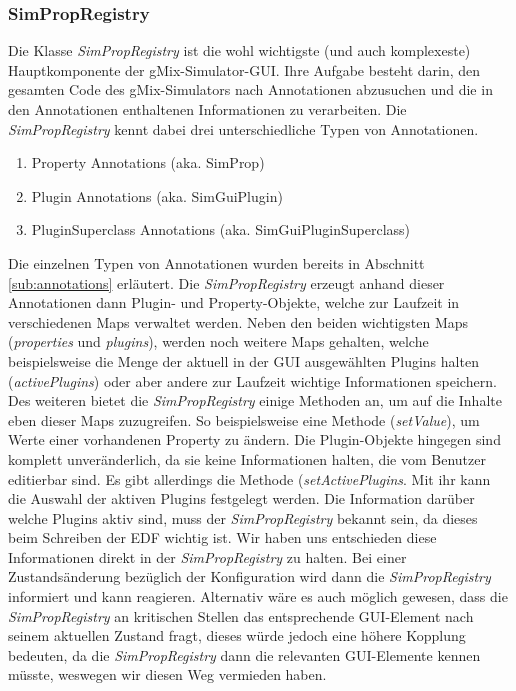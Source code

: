 \documentclass[a4paper, 11pt]{article} %
\begin{document}
\subsubsection{SimPropRegistry}
\label{sssub:simpropregistry}
Die Klasse \emph{SimPropRegistry} ist die wohl wichtigste (und auch komplexeste) Hauptkomponente der gMix-Simulator-GUI. Ihre Aufgabe besteht darin, den gesamten Code des gMix-Simulators nach Annotationen abzusuchen und die in den Annotationen enthaltenen Informationen zu verarbeiten. Die \emph{SimPropRegistry} kennt dabei drei unterschiedliche Typen von Annotationen.

\begin{enumerate}
	\item Property Annotations (aka. SimProp)
	\item Plugin Annotations (aka. SimGuiPlugin)
	\item PluginSuperclass Annotations (aka. SimGuiPluginSuperclass)
\end{enumerate}

Die einzelnen Typen von Annotationen wurden bereits in Abschnitt \ref{sub:annotations} erläutert. Die \emph{SimPropRegistry} erzeugt anhand dieser Annotationen dann Plugin- und Property-Objekte, welche zur Laufzeit in verschiedenen Maps verwaltet werden. Neben den beiden wichtigsten Maps (\emph{properties} und \emph{plugins}), werden noch weitere Maps gehalten, welche beispielsweise die Menge der aktuell in der GUI ausgewählten Plugins halten (\emph{activePlugins}) oder aber andere zur Laufzeit wichtige Informationen speichern.\\

Des weiteren bietet die \emph{SimPropRegistry} einige Methoden an, um auf die Inhalte eben dieser Maps zuzugreifen. So beispielsweise eine Methode (\emph{setValue}), um Werte einer vorhandenen Property zu ändern. Die Plugin-Objekte hingegen sind komplett unveränderlich, da sie keine Informationen halten, die vom Benutzer editierbar sind. Es gibt allerdings die Methode (\emph{setActivePlugins}. Mit ihr kann die Auswahl der aktiven Plugins festgelegt werden. Die Information darüber welche Plugins aktiv sind, muss der \emph{SimPropRegistry} bekannt sein, da dieses beim Schreiben der EDF wichtig ist. Wir haben uns entschieden diese Informationen direkt in der \emph{SimPropRegistry} zu halten. Bei einer Zustandsänderung bezüglich der Konfiguration wird dann die \emph{SimPropRegistry} informiert und kann reagieren. Alternativ wäre es auch möglich gewesen, dass die \emph{SimPropRegistry} an kritischen Stellen das entsprechende GUI-Element nach seinem aktuellen Zustand fragt, dieses würde jedoch eine höhere Kopplung bedeuten, da die \emph{SimPropRegistry} dann die relevanten GUI-Elemente kennen müsste, weswegen wir diesen Weg vermieden haben.\\
\end{document}
